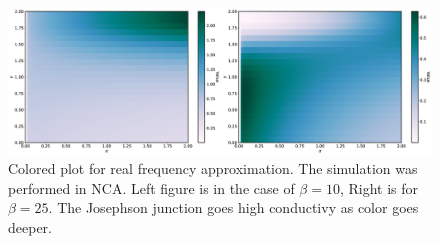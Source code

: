 \documentclass{article}[12pt]
\begin{document}
\begin{spacing}{1.5}
\begin{figure}[H]
  \centerline{\includegraphics[width=16cm]{TexFigure/chi_color.png}}
  \caption{Colored plot for real frequency approximation. The simulation was performed in NCA. Left figure is in the case of $\beta=10$, Right is for $\beta=25$.
  The Josephson junction goes high conductivy as color goes deeper.}
\end{figure}
\pagebreak

\end{spacing}
\end{document}
